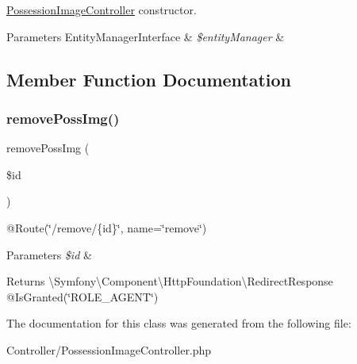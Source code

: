 \mbox{\hyperlink{class_app_1_1_controller_1_1_possession_image_controller}{Possession\+Image\+Controller}} constructor. 
\begin{DoxyParams}[1]{Parameters}
Entity\+Manager\+Interface & {\em \$entity\+Manager} & \\
\hline
\end{DoxyParams}


\subsection{Member Function Documentation}
\mbox{\label{class_app_1_1_controller_1_1_possession_image_controller_a68e59335ed2c9c59f8868e7a81dadb85}} 
\subsubsection{\texorpdfstring{removePossImg()}{removePossImg()}}
{\footnotesize\ttfamily remove\+Poss\+Img (\begin{DoxyParamCaption}\item[{}]{\$id }\end{DoxyParamCaption})}

@\+Route(\char`\"{}/remove/\{id\}\char`\"{}, name=\char`\"{}remove\char`\"{}) 
\begin{DoxyParams}{Parameters}
{\em \$id} & \\
\hline
\end{DoxyParams}
\begin{DoxyReturn}{Returns}
\textbackslash{}\+Symfony\textbackslash{}\+Component\textbackslash{}\+Http\+Foundation\textbackslash{}\+Redirect\+Response @\+Is\+Granted(\char`\"{}\+R\+O\+L\+E\+\_\+\+A\+G\+E\+N\+T\char`\"{}) 
\end{DoxyReturn}


The documentation for this class was generated from the following file\+:\begin{DoxyCompactItemize}
\item 
Controller/Possession\+Image\+Controller.\+php\end{DoxyCompactItemize}
